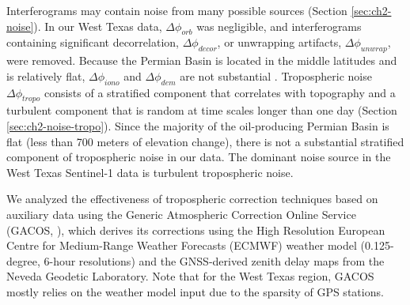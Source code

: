 Interferograms may contain noise from many possible sources (Section \ref{sec:ch2-noise}). %
In our West Texas data, $\Delta \phi_{orb}$ was negligible, and interferograms containing significant decorrelation, $\Delta \phi_{decor}$, or unwrapping artifacts, $\Delta \phi_{unwrap}$, were removed. Because the Permian Basin is located in the middle latitudes and is relatively flat, $\Delta \phi_{iono}$ and $\Delta \phi_{dem}$  are not substantial \citep{Fattahi2013DemErrorCorrection, Liang2019IonosphericCorrectionInsar}. 
Tropospheric noise $\Delta \phi_{tropo}$ consists of a stratified component that correlates with topography \citep{Doin2009CorrectionsStratifiedTropospheric} and a turbulent component that is random at time scales longer than one day \citep{Emardson2003NeutralAtmosphericDelay} (Section \ref{sec:ch2-noise-tropo}).
Since the majority of the oil-producing Permian Basin is flat (less than 700 meters of elevation change), there is not a substantial stratified component of tropospheric noise in our data. 
The dominant noise source in the West Texas Sentinel-1 data is turbulent tropospheric noise.





We analyzed the effectiveness of tropospheric correction techniques based on auxiliary data using the Generic Atmospheric Correction Online Service (GACOS, \citep{Yu2018InterferometricSyntheticAperture,Yu2018GenericAtmosphericCorrection}), 
which derives its corrections using the High Resolution European Centre for Medium-Range Weather Forecasts (ECMWF) weather model (0.125-degree, 6-hour resolutions) and the GNSS-derived zenith delay maps from the Neveda Geodetic Laboratory.
Note that for the West Texas region, GACOS mostly relies on the weather model input due to the sparsity of GPS stations.


